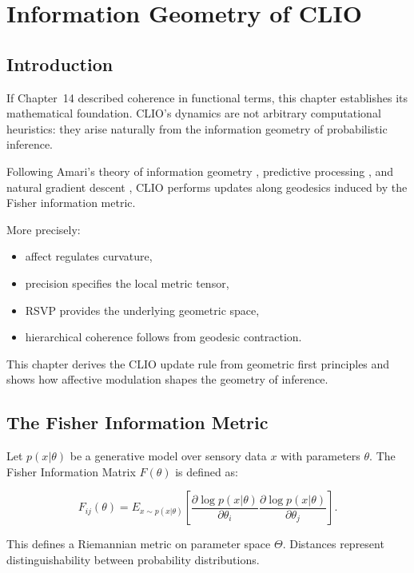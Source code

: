 \documentclass[12pt,oneside]{book}
\theoremstyle{plain}
\theoremstyle{definition}
\let\citep\parencite
\def\mathbb#1{#1}%
\begin{document}
\chapter{Information Geometry of CLIO}

\section{Introduction}

If Chapter~14 described coherence in functional terms, this chapter establishes
its mathematical foundation.
CLIO’s dynamics are not arbitrary computational heuristics: they arise naturally
from the information geometry of probabilistic inference.

Following Amari’s theory of information geometry
\citep{amari1998natural,amari2016information}, predictive processing
\citep{friston2010freeenergy}, and natural gradient descent
\citep{amari1998natural}, CLIO performs updates along geodesics induced by the
Fisher information metric.

More precisely:

\begin{itemize}
    \item affect regulates curvature,
    \item precision specifies the local metric tensor,
    \item RSVP provides the underlying geometric space,
    \item hierarchical coherence follows from geodesic contraction.
\end{itemize}

This chapter derives the CLIO update rule from geometric first principles and
shows how affective modulation shapes the geometry of inference.

\section{The Fisher Information Metric}

Let $p(x|\theta)$ be a generative model over sensory data $x$ with parameters
$\theta$. The Fisher Information Matrix $F(\theta)$ is defined as:

\[
F_{ij}(\theta)
=
\mathbb{E}_{x \sim p(x|\theta)}
\left[
\frac{\partial \log p(x|\theta)}{\partial \theta_i}
\frac{\partial \log p(x|\theta)}{\partial \theta_j}
\right].
\]

This defines a Riemannian metric on parameter space $\Theta$.
Distances represent distinguishability between probability distributions.
\end{document}
